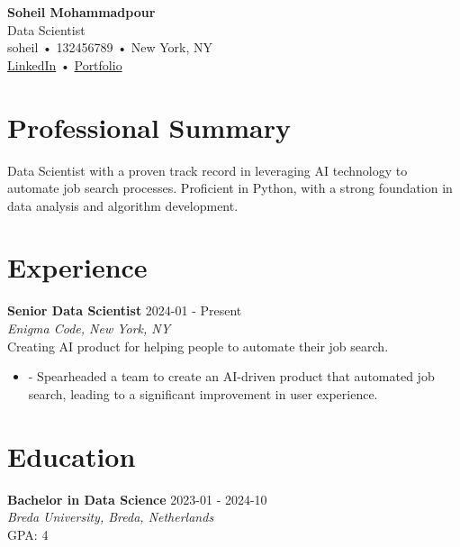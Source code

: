 \documentclass[11pt,a4paper]{article}
\begin{document}
\begin{center}
\textbf{\Large Soheil Mohammadpour}\\[0.3em]
Data Scientist\\[0.3em]
soheil • 132456789 • New York, NY\\[0.2em]
\href{linkedin.com/in/soheil-mp}{LinkedIn} 
• \href{github.com/soheil-mp}{Portfolio}
\end{center}


\section*{Professional Summary}
Data Scientist with a proven track record in leveraging AI technology to automate job search processes. Proficient in Python, with a strong foundation in data analysis and algorithm development.



\section*{Experience}

\noindent\textbf{Senior Data Scientist} \hfill 2024-01 - Present\\
\textit{Enigma Code, New York, NY}\\
Creating AI product for helping people to automate their job search.\\
\begin{itemize}
\item - Spearheaded a team to create an AI-driven product that automated job search, leading to a significant improvement in user experience.

\end{itemize}



\section*{Education}

\noindent\textbf{Bachelor in Data Science} \hfill 2023-01 - 2024-10\\
\textit{Breda University, Breda, Netherlands}\\
GPA: 4\\
\begin{itemize}

\end{itemize}
\end{document}
